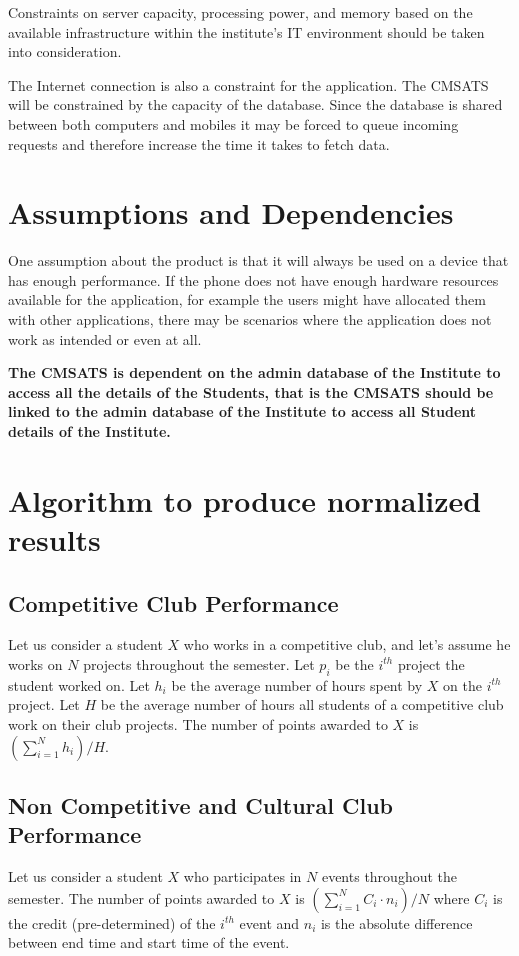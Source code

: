 \noindent Constraints on server capacity, processing power, and memory based on the available infrastructure within the institute's IT environment should be taken into consideration.
\vspace{1em}

\noindent The Internet connection is also a constraint for the application.
The CMSATS will be constrained by the capacity of the database. Since the database is shared between both computers and mobiles it may be forced to queue incoming requests and therefore increase the time it takes to fetch data.

\section{Assumptions and Dependencies}
One assumption about the product is that it will always be used on a device that has enough performance. If the phone does not have enough hardware resources available for the application, for example the users might have allocated them with other applications, there may be scenarios where the
application does not work as intended or even at all. 
\vspace{1em}

\noindent \textbf{The CMSATS is dependent on the admin database of the Institute to access all the details of the Students, that is the CMSATS should be linked to the admin database of the Institute to access all Student details of the Institute.}
\newpage

\section{Algorithm to produce normalized results}
\subsection{Competitive Club Performance}
Let us consider a student $X$ who works in a competitive club, and let's assume he works on $N$ projects throughout the semester. Let $p_i$ be the $i^{th}$ project the student worked on. Let $h_i$ be the average number of hours spent by $X$ on the $i^{th}$ project. Let $H$ be the average number of hours all students of a competitive club work on their club projects. The number of points awarded to $X$ is $\left( \sum_{i=1}^{N} h_i \right) / H$.

\subsection{Non Competitive and Cultural Club Performance}
Let us consider a student $X$ who participates in $N$ events throughout the semester. The number of points awarded to $X$ is $\left( \sum_{i=1}^{N} C_i \cdot n_i \right) / N$ where $C_i$ is the credit (pre-determined) of the $i^{th}$ event and $n_i$ is the absolute difference between end time and start time of the event.
\vspace{1em}


